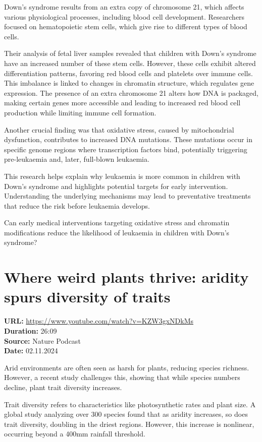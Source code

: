 \documentclass[12pt]{article}
\begin{document}
Down’s syndrome results from an extra copy of chromosome 21, which affects various physiological processes, including blood cell development. Researchers focused on hematopoietic stem cells, which give rise to different types of blood cells.

Their analysis of fetal liver samples revealed that children with Down’s syndrome have an increased number of these stem cells. However, these cells exhibit altered differentiation patterns, favoring red blood cells and platelets over immune cells. This imbalance is linked to changes in chromatin structure, which regulates gene expression. The presence of an extra chromosome 21 alters how DNA is packaged, making certain genes more accessible and leading to increased red blood cell production while limiting immune cell formation.

Another crucial finding was that oxidative stress, caused by mitochondrial dysfunction, contributes to increased DNA mutations. These mutations occur in specific genome regions where transcription factors bind, potentially triggering pre-leukaemia and, later, full-blown leukaemia.

This research helps explain why leukaemia is more common in children with Down’s syndrome and highlights potential targets for early intervention. Understanding the underlying mechanisms may lead to preventative treatments that reduce the risk before leukaemia develops.

\vspace{0.5cm}
Can early medical interventions targeting oxidative stress and chromatin modifications reduce the likelihood of leukaemia in children with Down’s syndrome?

\newpage

\section{Where weird plants thrive: aridity spurs diversity of traits}
\textbf{URL:} \url{https://www.youtube.com/watch?v=KZW3gxNDkMs}\\
\textbf{Duration:} 26:09\\
\textbf{Source:} Nature Podcast\\
\textbf{Date:} 02.11.2024


Arid environments are often seen as harsh for plants, reducing species richness. However, a recent study challenges this, showing that while species numbers decline, plant trait diversity increases.

Trait diversity refers to characteristics like photosynthetic rates and plant size. A global study analyzing over 300 species found that as aridity increases, so does trait diversity, doubling in the driest regions. However, this increase is nonlinear, occurring beyond a 400mm rainfall threshold.
\end{document}
